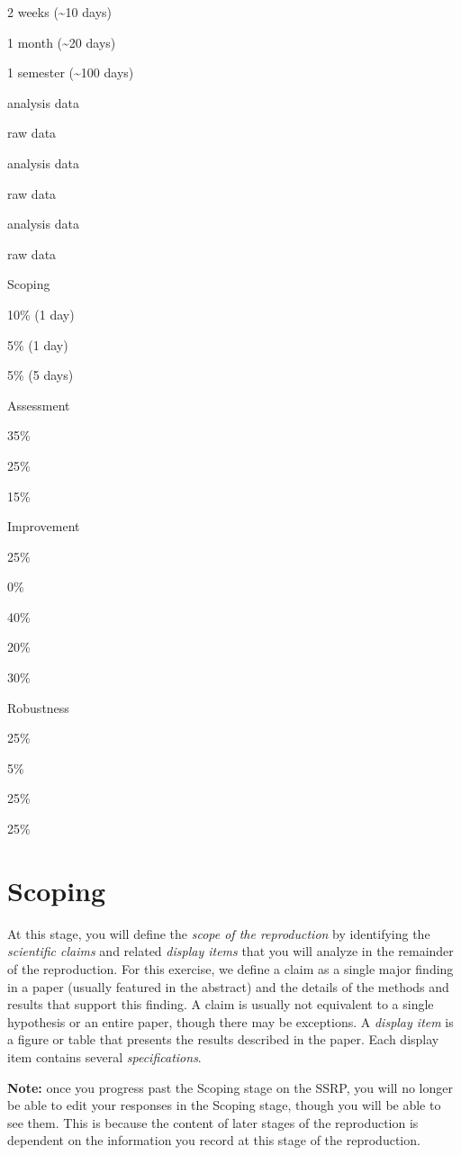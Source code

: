 \documentclass[
]{book}
\begin{document}
2 weeks (\textasciitilde10 days)

1 month (\textasciitilde20 days)

1 semester (\textasciitilde100 days)

analysis data

raw data

analysis data

raw data

analysis data

raw data

Scoping

10\% (1 day)

5\% (1 day)

5\% (5 days)

Assessment

35\%

25\%

15\%

Improvement

25\%

0\%

40\%

20\%

30\%

Robustness

25\%

5\%

25\%

25\%

\hypertarget{scoping}{%
\chapter{Scoping}\label{scoping}}

At this stage, you will define the \emph{scope of the reproduction} by identifying the \emph{scientific claims} and related \emph{display items} that you will analyze in the remainder of the reproduction. For this exercise, we define a claim as a single major finding in a paper (usually featured in the abstract) and the details of the methods and results that support this finding. A claim is usually not equivalent to a single hypothesis or an entire paper, though there may be exceptions. A \emph{display item} is a figure or table that presents the results described in the paper. Each display item contains several \emph{specifications}.

\textbf{Note:} once you progress past the Scoping stage on the SSRP, you will no longer be able to edit your responses in the Scoping stage, though you will be able to see them. This is because the content of later stages of the reproduction is dependent on the information you record at this stage of the reproduction.
\end{document}
